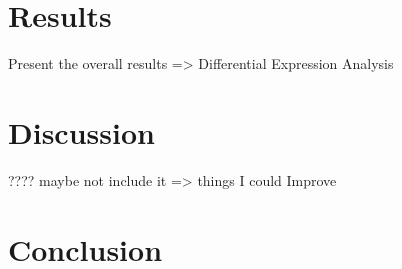 \documentclass[a4paper, 11pt]{article}
\begin{document}
\begin{multicols}{2}

\section{Results}

Present the overall results => Differential Expression Analysis


\section{Discussion}
???? maybe not include it
=> things I could Improve


\section{Conclusion}




\end{multicols}
\end{document}
